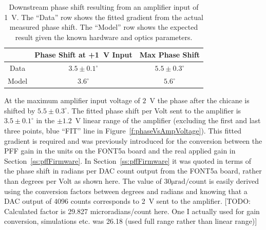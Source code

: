 \begin{table}
  \begin{center}
    \begin{tabular}{| c | c | c |}
	   \hline
        & Phase Shift at +1~V Input & Max Phase Shift \\ \hline
       Data & \(3.5\pm0.1^\circ\) & \(5.5\pm0.3^\circ\) \\
	   Model & \(3.6^\circ\) & \(5.6^\circ\) \\
 	   \hline
    \end{tabular}
    \caption{Downstream phase shift resulting from an amplifier input of 1~V. The ``Data'' row shows the fitted gradient from the actual measured phase shift. The ``Model'' row shows the expected result given the known hardware and optics parameters.}
  	\label{t:PhaseVsDAC}
  \end{center}
\end{table}

At the maximum amplifier input voltage of \(2\)~V the phase after the chicane is shifted by \(5.5\pm0.3^\circ\). The fitted phase shift per Volt sent to the amplifier is \(3.5\pm0.1^\circ\) in the \(\pm1.2\)~V linear range of the amplifier (excluding the first and last three points, blue ``FIT'' line in Figure~\ref{f:phaseVsAmpVoltage}). This fitted gradient is required and was previously introduced for the conversion between the PFF gain in the units on the FONT5a board and the real applied gain in Section~\ref{ss:pffFirmware}. In Section~\ref{ss:pffFirmware} it was quoted in terms of the phase shift in radians per DAC count output from the FONT5a board, rather than degrees per Volt as shown here. The value of \(30\mathrm{\mu rad/count}\) is easily derived using the conversion factors between degrees and radians and knowing that a DAC output of 4096 counts corresponds to 2~V sent to the amplifier.
[TODO: Calculated factor is 29.827 microradians/count here. One I actually used for gain conversion, simulations etc. was 26.18 (used full range rather than linear range)]

